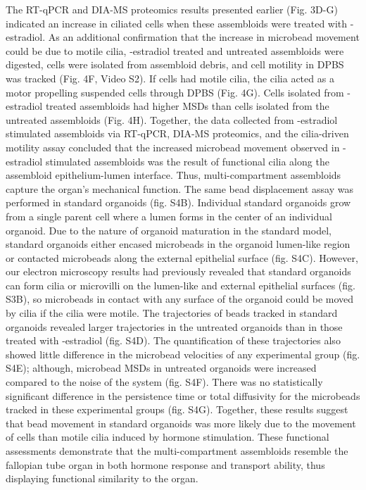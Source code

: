 \begin{refsection}
    The RT-qPCR and DIA-MS proteomics results presented earlier (Fig. 3D-G) indicated an increase in ciliated cells when these assembloids were treated with \textbeta-estradiol. As an additional confirmation that the increase in microbead movement could be due to motile cilia, \textbeta-estradiol treated and untreated assembloids were digested, cells were isolated from assembloid debris, and cell motility in DPBS was tracked (Fig. 4F, Video S2). If cells had motile cilia, the cilia acted as a motor propelling suspended cells through DPBS\cite{garcia2018a} (Fig. 4G). Cells isolated from \textbeta-estradiol treated assembloids had higher MSDs than cells isolated from the untreated assembloids (Fig. 4H). Together, the data collected from \textbeta-estradiol stimulated assembloids via RT-qPCR, DIA-MS proteomics, and the cilia-driven motility assay concluded that the increased microbead movement observed in \textbeta-estradiol stimulated assembloids was the result of functional cilia along the assembloid epithelium-lumen interface. Thus, multi-compartment assembloids capture the organ’s mechanical function.
    The same bead displacement assay was performed in standard organoids (fig. S4B). Individual standard organoids grow from a single parent cell where a lumen forms in the center of an individual organoid\cite{kessler2015a}. Due to the nature of organoid maturation in the standard model, standard organoids either encased microbeads in the organoid lumen-like region or contacted microbeads along the external epithelial surface (fig. S4C). However, our electron microscopy results had previously revealed that standard organoids can form cilia or microvilli on the lumen-like and external epithelial surfaces (fig. S3B), so microbeads in contact with any surface of the organoid could be moved by cilia if the cilia were motile. The trajectories of beads tracked in standard organoids revealed larger trajectories in the untreated organoids than in those treated with \textbeta-estradiol (fig. S4D). The quantification of these trajectories also showed little difference in the microbead velocities of any experimental group (fig. S4E); although, microbead MSDs in untreated organoids were increased compared to the noise of the system (fig. S4F). There was no statistically significant difference in the persistence time or total diffusivity for the microbeads tracked in these experimental groups (fig. S4G). Together, these results suggest that bead movement in standard organoids was more likely due to the movement of cells than motile cilia induced by hormone stimulation.
    These functional assessments demonstrate that the multi-compartment assembloids resemble the fallopian tube organ in both hormone response and transport ability, thus displaying functional similarity to the organ.
    

\end{refsection}

